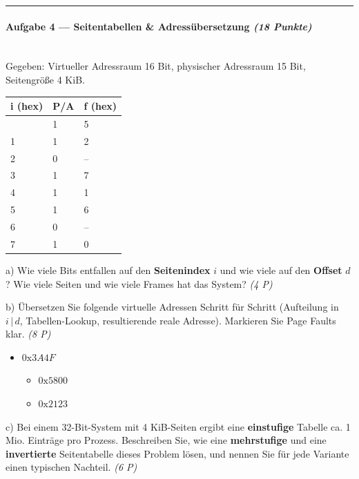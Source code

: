 \documentclass[11pt, a4paper]{article}
\begin{document}
\noindent\textcolor{rulegray}{\rule{\linewidth}{0.4pt}}


\paragraph{Aufgabe 4 — Seitentabellen \& Adressübersetzung \textit{(18 Punkte)}}\mbox{}\\[2pt]

Gegeben: Virtueller Adressraum 16 Bit, physischer Adressraum 15 Bit, Seitengröße 4 KiB.



{\small
\begin{tabularx}{\linewidth}{XXX}
\hline
\rowcolor{tableheadbg}
{\color{white}\textbf{i (hex)}} & {\color{white}\textbf{P/A}} & {\color{white}\textbf{f (hex)}} \\[2pt]
\hline
\endhead
\hline
\endfoot
0 & 1 & 5 \\
1 & 1 & 2 \\
2 & 0 & – \\
3 & 1 & 7 \\
4 & 1 & 1 \\
5 & 1 & 6 \\
6 & 0 & – \\
7 & 1 & 0 \\
\end{tabularx}
}


a) Wie viele Bits entfallen auf den \textbf{Seitenindex} $i$ und wie viele auf den \textbf{Offset} $d$? Wie viele Seiten und wie viele Frames hat das System? \textit{(4 P)}


b) Übersetzen Sie folgende virtuelle Adressen Schritt für Schritt (Aufteilung in $i\,|\,d$, Tabellen-Lookup, resultierende reale Adresse). Markieren Sie Page Faults klar. \textit{(8 P)}

\begin{itemize}
  \item $0\text{x}3A4F$
\begin{itemize}
  \item $0\text{x}5800$
  \item $0\text{x}2123$
\end{itemize}
\end{itemize}

c) Bei einem 32-Bit-System mit 4 KiB-Seiten ergibt eine \textbf{einstufige} Tabelle ca. 1 Mio. Einträge pro Prozess. Beschreiben Sie, wie eine \textbf{mehrstufige} und eine \textbf{invertierte} Seitentabelle dieses Problem lösen, und nennen Sie für jede Variante einen typischen Nachteil. \textit{(6 P)}
\end{document}
